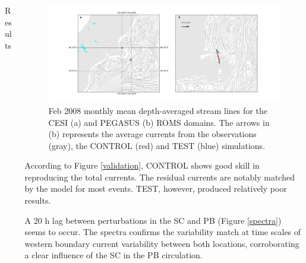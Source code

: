 \documentclass[final]{beamer}
\newlength{\onecolwid}
\newlength{\twocolwid}
\begin{document}
\begin{frame}[t]
\begin{columns}[t]
\begin{column}{\twocolwid}
\begin{columns}[t,totalwidth=\twocolwid]
\begin{column}{\onecolwid}
\begin{block}{Results}
            \end{block}


        \end{column} %

        \begin{column}{\onecolwid}\vspace{-.6in} %

            \begin{block}

            \begin{figure}
            \includegraphics[width=1.0\linewidth]{mean_flow.png}
            \caption{\label{mean_flow} Feb 2008 monthly mean depth-averaged stream lines for the CESI (a) and PEGASUS (b) ROMS domains. The arrows in (b) represents the average currents from the observations (gray), the CONTROL (red) and TEST (blue) simulations.}
            \end{figure}

            According to Figure \ref{validation}, CONTROL shows good skill in reproducing the total currents. The residual currents are notably matched by the model for most events. TEST, however, produced relatively poor results.

            A 20 h lag between perturbations in the SC and PB (Figure \ref{spectra}) seems to occur. The spectra confirms the variability match at time scales of western boundary current variability between both locations, corroborating a clear influence of the SC in the PB circulation. 


\end{block}
\end{column}
\end{columns}
\end{column}
\end{columns}
\end{frame}
\end{document}
